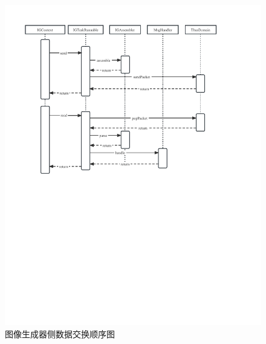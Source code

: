 \begin{figure}[h!]
    \begin{center}
        \includegraphics[width=\textwidth]{pictures/sequence3.pdf}
        \caption{图像生成器侧数据交换顺序图}
        \label{seq3}
    \end{center}
\end{figure}
